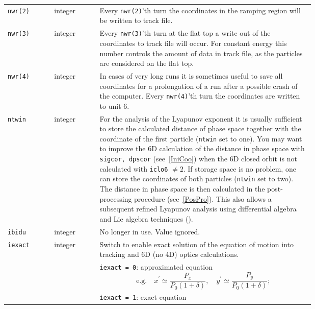 \begin{longtabu}{@{}llp{0.7\linewidth}}
    \texttt{nwr(2)}        & integer  & Every \texttt{nwr(2)}'th turn the coordinates in the ramping region will be written to track file. \\
    \texttt{nwr(3)}        & integer  & Every \texttt{nwr(3)}'th turn at the flat top a write out of the coordinates to track file will occur. For constant energy this number controls the amount of data in track file, as the particles are considered on the flat top. \\
    \texttt{nwr(4)}        & integer  & In cases of very long runs it is sometimes useful to save all coordinates for a prolongation of a run after a possible crash of the computer. Every \texttt{nwr(4)}'th turn the coordinates are written to unit 6. \\
    \texttt{ntwin}         & integer  & For the analysis of the Lyapunov exponent it is usually sufficient to store the calculated distance of phase space together with the coordinate of the first particle (\texttt{ntwin} set to one). You may want to improve the 6D calculation of the distance in phase space with \texttt{sigcor, dpscor} (see~\ref{IniCoo}) when the 6D closed orbit is not calculated with \texttt{iclo6} $\neq 2$. If storage space is no problem, one can store the coordinates of both particles (\texttt{ntwin} set to two). The distance in phase space is then calculated in the post-processing procedure (see~\ref{PosPro}). This also allows a subsequent refined Lyapunov analysis using differential algebra and Lie algebra techniques (\cite{Refine}). \\
    \texttt{ibidu}         & integer  & No longer in use. Value ignored. \\
    \texttt{iexact}        & integer  & Switch to enable exact solution of the equation of motion into tracking and 6D (no 4D) optics calculations. \\
                           &          & \texttt{iexact = 0}: approximated equation
                           \begin{equation*}
                                \mbox{e.g.}
                                \quad x^\prime \simeq \frac{P_x}{P_0(1+\delta)},
                                \quad y^\prime \simeq \frac{P_y}{P_0(1+\delta)};
                           \end{equation*} \\
                           &          & \texttt{iexact = 1}: exact equation
                           \begin{equation*}

\end{equation*}
\end{longtabu}
